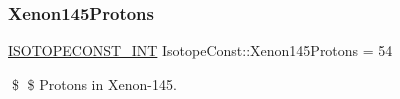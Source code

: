 \subsubsection{\texorpdfstring{Xenon145\+Protons}{Xenon145Protons}}
{\footnotesize\ttfamily \mbox{\hyperlink{group___isotope_const-_macros_ga5f18360b3e99483a35c32d789e62621c}{I\+S\+O\+T\+O\+P\+E\+C\+O\+N\+S\+T\+\_\+\+I\+NT}} Isotope\+Const\+::\+Xenon145\+Protons = 54}

\$ \$ Protons in Xenon-\/145. 